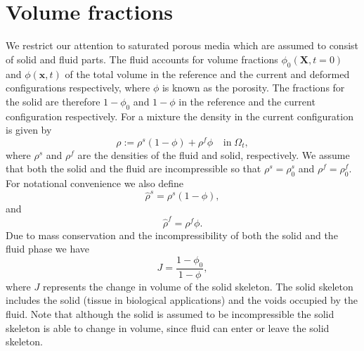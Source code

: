 \section{Volume fractions}
We restrict our attention to saturated porous media which are assumed to consist of solid and fluid parts. The fluid accounts for volume fractions $\phi_{0}(\boldsymbol{X},t=0)$ and $\phi(\boldsymbol{x},t)$ of the total volume in the reference and the current and deformed configurations respectively, where $\phi$ is known as the porosity. The fractions for the solid are therefore $1-\phi_{0}$ and $1-\phi$ in the reference and the current configuration respectively. For a mixture the density in the current configuration is given by
\begin{equation}
\rho:=\rho^{s}(1-\phi) + \rho^{f}\phi \;\;\;\ \mbox{in} \; \Omega_{t},
\label{rho_mixture}
\end{equation}
\noindent where $\rho^{s}$ and $\rho^{f}$ are the densities of the fluid and solid, respectively. We assume that both the solid and the fluid are incompressible so that $\rho^{s}=\rho^{s}_{0}$ and $\rho^{f}=\rho^{f}_{0}$. For notational convenience we also define
\begin{equation}
\hat\rho^{s}=\rho^{s}(1-\phi),
\label{eqn:rhos_hat}
\end{equation}
and
\begin{equation}
\hat\rho^{f}=\rho^{f}\phi.
\label{eqn:rhof_hat}
\end{equation}
Due to mass conservation and the incompressibility of both the solid and the fluid phase we have
\begin{equation}
J = \frac{1-\phi_{0}}{1-\phi},
\label{incomp_mixture}
\end{equation}
where $J$ represents the change in volume of the solid skeleton. The solid skeleton includes the solid (tissue in biological applications) and the voids occupied by the fluid. Note that although the solid is assumed to be incompressible the solid skeleton is able to change in volume, since fluid can enter or leave the solid skeleton.

